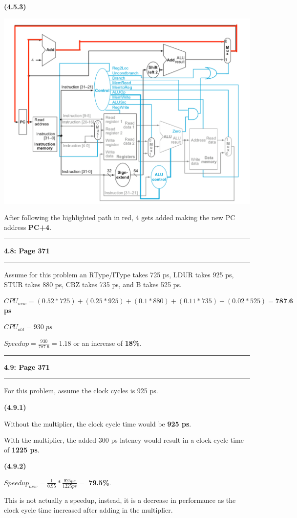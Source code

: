 \documentclass[11pt]{article}
\newcommand\question[2]{\vspace{.25in}\hrule\textbf{#1: #2}\vspace{.5em}\hrule\vspace{.10in}}
\renewcommand\part[1]{\vspace{.10in}\textbf{(#1)}\par}
\begin{document}
	\part{4.5.3}
		\includegraphics[scale=0.75]{images/453.png}\par
		After following the highlighted path in red, 4 gets added making the new PC address \textbf{PC+4}.\par
	
	
%
%
\question{4.8}{Page 371}
	Assume for this problem an RType/IType takes 725 ps, LDUR takes 925 ps, STUR takes 880 ps, CBZ takes 735 ps, and B takes 525 ps.\par
	$CPU_{new} = (0.52*725)+(0.25*925)+(0.1*880) + (0.11*735)+(0.02*525)=\textbf{787.6}$ \textbf{ps}\par
	$CPU_{old} = 930 \; ps$\par
	$Speedup = \frac{930}{787.6}=1.18$ or an increase of \textbf{18\%}.
	
	
\question{4.9}{Page 371}
	For this problem, assume the clock cycles is 925 ps.\par
	\part{4.9.1}
		Without the multiplier, the clock cycle time would be \textbf{925 ps}.\par
		With the multiplier, the added 300 ps latency would result in a clock cycle time of \textbf{1225 ps}.\par
	
	\part{4.9.2}
		$Speedup_{new}=\frac{1}{0.95} * \frac{925ps}{1225ps}=$ \textbf{79.5\%}.\par
		This is not actually a speedup, instead, it is a decrease in performance as the clock cycle time increased after adding in the multiplier.\par
		
\end{document}
